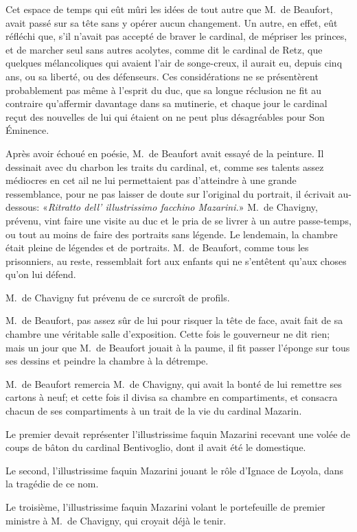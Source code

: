 Cet espace de temps qui eût mûri les idées de tout autre que M.~de Beaufort, avait passé sur sa tête sans y opérer aucun changement. Un autre, en effet, eût réfléchi que, s'il n'avait pas accepté de braver le cardinal, de mépriser les princes, et de marcher seul sans autres acolytes, comme dit le cardinal de Retz, que quelques mélancoliques qui avaient l'air de songe-creux, il aurait eu, depuis cinq ans, ou sa liberté, ou des défenseurs. Ces considérations ne se présentèrent probablement pas même à l'esprit du duc, que sa longue réclusion ne fit au contraire qu'affermir davantage dans sa mutinerie, et chaque jour le cardinal reçut des nouvelles de lui qui étaient on ne peut plus désagréables pour Son Éminence.

Après avoir échoué en poésie, M.~de Beaufort avait essayé de la peinture. Il dessinait avec du charbon les traits du cardinal, et, comme ses talents assez médiocres en cet ail ne lui permettaient pas d'atteindre à une grande ressemblance, pour ne pas laisser de doute sur l'original du portrait, il écrivait au-dessous: «\textit{Ritratto dell' illustrissimo facchino Mazarini.}» M.~de Chavigny, prévenu, vint faire une visite au duc et le pria de se livrer à un autre passe-temps, ou tout au moins de faire des portraits sans légende. Le lendemain, la chambre était pleine de légendes et de portraits. M.~de Beaufort, comme tous les prisonniers, au reste, ressemblait fort aux enfants qui ne s'entêtent qu'aux choses qu'on lui défend.

M.~de Chavigny fut prévenu de ce surcroît de profils.

M.~de Beaufort, pas assez sûr de lui pour risquer la tête de face, avait fait de sa chambre une véritable salle d'exposition. Cette fois le gouverneur ne dit rien; mais un jour que M.~de Beaufort jouait à la paume, il fit passer l'éponge sur tous ses dessins et peindre la chambre à la détrempe.

M.~de Beaufort remercia M.~de Chavigny, qui avait la bonté de lui remettre ses cartons à neuf; et cette fois il divisa sa chambre en compartiments, et consacra chacun de ses compartiments à un trait de la vie du cardinal Mazarin.

Le premier devait représenter l'illustrissime faquin Mazarini recevant une volée de coups de bâton du cardinal Bentivoglio, dont il avait été le domestique.

Le second, l'illustrissime faquin Mazarini jouant le rôle d'Ignace de Loyola, dans la tragédie de ce nom.

Le troisième, l'illustrissime faquin Mazarini volant le portefeuille de premier ministre à M.~de Chavigny, qui croyait déjà le tenir.

